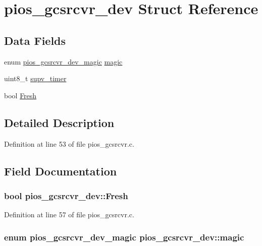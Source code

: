 \hypertarget{structpios__gcsrcvr__dev}{\section{pios\-\_\-gcsrcvr\-\_\-dev \-Struct \-Reference}
\label{structpios__gcsrcvr__dev}
}
\subsection*{\-Data \-Fields}
\begin{DoxyCompactItemize}
\item 
enum \hyperlink{group___p_i_o_s___g_c_s_r_c_v_r_ga88de96a8f2cf14a06395b79f0996c923}{pios\-\_\-gcsrcvr\-\_\-dev\-\_\-magic} \hyperlink{structpios__gcsrcvr__dev_a39049abd66fd252962f3a7ce9d14c3f7}{magic}
\item 
uint8\-\_\-t \hyperlink{structpios__gcsrcvr__dev_a3f792c850523f7eba7efbb0aeebeba37}{supv\-\_\-timer}
\item 
bool \hyperlink{structpios__gcsrcvr__dev_a1f2f772ea9bb9487b52dc3b3bf679694}{\-Fresh}
\end{DoxyCompactItemize}


\subsection{\-Detailed \-Description}


\-Definition at line 53 of file pios\-\_\-gcsrcvr.\-c.



\subsection{\-Field \-Documentation}
\hypertarget{structpios__gcsrcvr__dev_a1f2f772ea9bb9487b52dc3b3bf679694}{
\subsubsection[{\-Fresh}]{\setlength{\rightskip}{0pt plus 5cm}bool {\bf pios\-\_\-gcsrcvr\-\_\-dev\-::\-Fresh}}}\label{structpios__gcsrcvr__dev_a1f2f772ea9bb9487b52dc3b3bf679694}


\-Definition at line 57 of file pios\-\_\-gcsrcvr.\-c.

\hypertarget{structpios__gcsrcvr__dev_a39049abd66fd252962f3a7ce9d14c3f7}{
\subsubsection[{magic}]{\setlength{\rightskip}{0pt plus 5cm}enum {\bf pios\-\_\-gcsrcvr\-\_\-dev\-\_\-magic} {\bf pios\-\_\-gcsrcvr\-\_\-dev\-::magic}}}\label{structpios__gcsrcvr__dev_a39049abd66fd252962f3a7ce9d14c3f7}


